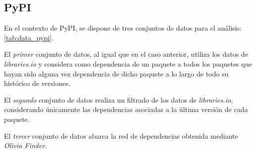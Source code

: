 \subsection{PyPI}

En el contexto de PyPI, se dispone de tres conjuntos de datos para el análisis: \ref{tab:data_pypi}.

El \textit{primer} conjunto de datos, al igual que en el caso anterior, utiliza los datos de \textit{libraries.io} y considera como dependencia de un paquete a todos los paquetes que hayan sido alguna vez dependencia de dicho paquete a lo largo de todo su histórico de versiones.

El \textit{segundo} conjunto de datos realiza un filtrado de los datos de \textit{libraries.io}, considerando únicamente las dependencias asociadas a la última versión de cada paquete.

El \textit{tercer} conjunto de datos abarca la red de dependencias obtenida mediante \textit{Olivia Finder}.

